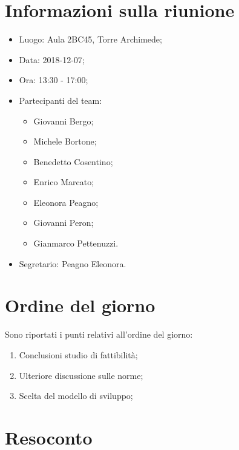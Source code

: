 \documentclass[11pt,a4paper]{article}
\begin{document}
	\section{Informazioni sulla riunione}
	\begin{itemize}
	\item Luogo: Aula 2BC45, Torre Archimede;
	\item Data: 2018-12-07;
	\item Ora: 13:30 - 17:00;
	\item Partecipanti del team: 
	\begin{itemize}
		\item Giovanni Bergo;
		\item Michele Bortone;
		\item Benedetto Cosentino;
		\item Enrico Marcato;
		\item Eleonora Peagno;
		\item Giovanni Peron;
		\item Gianmarco Pettenuzzi.
	\end{itemize}
	\item Segretario: Peagno Eleonora.
	\end{itemize}

	\section{Ordine del giorno}
	Sono riportati i punti relativi all'ordine del giorno:
	\begin{enumerate}
	\item Conclusioni studio di fattibilità;
	\item Ulteriore discussione sulle norme;
	\item Scelta del modello di sviluppo; 
	\end{enumerate}
	
	\section{Resoconto}	
\end{document}
